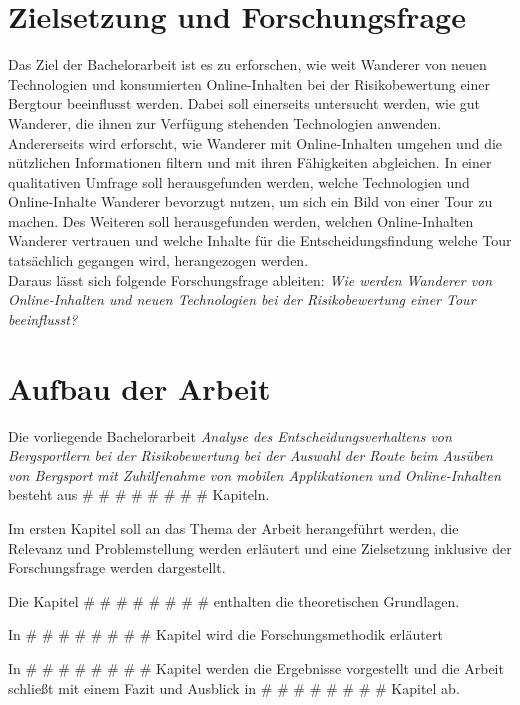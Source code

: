 \section{Zielsetzung und Forschungsfrage}


Das Ziel der Bachelorarbeit ist es zu erforschen, wie weit  Wanderer von neuen Technologien und konsumierten Online-Inhalten bei der Risikobewertung einer Bergtour beeinflusst werden. Dabei soll einerseits untersucht werden, wie gut Wanderer, die ihnen zur Verfügung stehenden Technologien anwenden. Andererseits wird erforscht, wie Wanderer mit Online-Inhalten umgehen und die nützlichen Informationen filtern und mit ihren Fähigkeiten abgleichen. In einer qualitativen Umfrage soll herausgefunden werden, welche Technologien und Online-Inhalte Wanderer bevorzugt nutzen, um sich ein Bild von einer Tour zu machen. Des Weiteren soll herausgefunden werden, welchen Online-Inhalten Wanderer vertrauen und welche Inhalte für die Entscheidungsfindung welche Tour tatsächlich gegangen wird, herangezogen werden.\\
Daraus lässt sich folgende Forschungsfrage ableiten: 
\textit{Wie werden Wanderer von Online-Inhalten und neuen Technologien bei der Risikobewertung einer Tour beeinflusst?}

\section{Aufbau der Arbeit}

Die vorliegende Bachelorarbeit \textit{Analyse des Entscheidungsverhaltens von Bergsportlern bei der Risikobewertung bei der Auswahl der Route beim Ausüben von Bergsport mit Zuhilfenahme von mobilen Applikationen und Online-Inhalten} besteht aus \# \# \# \# \# \# \# \# Kapiteln.\par

Im ersten Kapitel soll an das Thema der Arbeit herangeführt werden, die Relevanz und Problemstellung werden erläutert und eine Zielsetzung inklusive der Forschungsfrage werden dargestellt.\par

Die Kapitel \# \# \# \# \# \# \# \# enthalten die theoretischen Grundlagen.\par

In \# \# \# \# \# \# \# \# Kapitel wird die Forschungsmethodik erläutert\par

In \# \# \# \# \# \# \# \# Kapitel werden die Ergebnisse vorgestellt und die Arbeit schließt mit einem Fazit und Ausblick in \# \# \# \# \# \# \# \# Kapitel ab.

